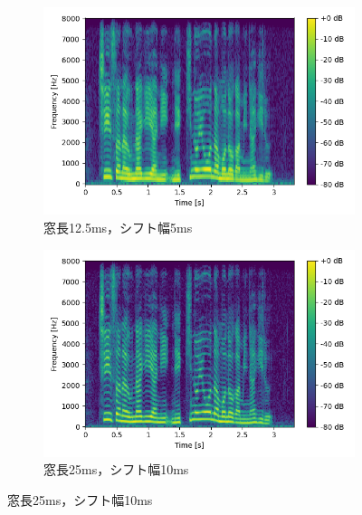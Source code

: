 \documentclass[12pt]{jarticle}
\numberwithin{equation}{section}    %
\numberwithin{figure}{section}      %
\numberwithin{table}{section}      %
\begin{document}
\begin{figure}[tb]
    \centering
    \begin{subfigure}[b]{0.48\textwidth}
        \centering
        \includegraphics[width=\textwidth]{./figure/sec2/spectrogram_1.png}
        \caption{窓長12.5ms，シフト幅5ms}
        \label{sec2:fig:spectrogram1}
    \end{subfigure}
    \begin{subfigure}[b]{0.48\textwidth}
        \centering
        \includegraphics[width=\textwidth]{./figure/sec2/spectrogram_2.png}
        \caption{窓長25ms，シフト幅10ms}
        \label{sec2:fig:spectrogram2}
    \end{subfigure}

    \vspace{0.5cm}


\end{figure}
\end{document}
